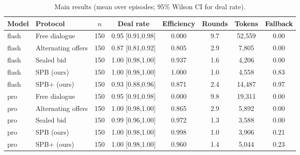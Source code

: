 \begin{table}[t]\centering
\caption{Main results (mean over episodes; 95\% Wilson CI for deal rate).}
\label{tab:v3main}
\begin{tabular}{llcccccc}\toprule
Model & Protocol & $n$ & Deal rate & Efficiency & Rounds & Tokens & Fallback \\ \midrule
flash & Free dialogue & 150 & 0.95 [0.91,0.98] & 0.000 & 9.7 & 52,559 & 0.00 \\
flash & Alternating offers & 150 & 0.87 [0.81,0.92] & 0.805 & 2.9 & 7,805 & 0.00 \\
flash & Sealed bid & 150 & 1.00 [0.98,1.00] & 0.937 & 1.6 & 4,206 & 0.00 \\
flash & SPB (ours) & 150 & 1.00 [0.98,1.00] & 1.000 & 1.0 & 4,558 & 0.83 \\
flash & SPB+ (ours) & 150 & 0.93 [0.88,0.96] & 0.871 & 2.4 & 14,487 & 0.97 \\
pro & Free dialogue & 150 & 0.95 [0.91,0.98] & 0.000 & 9.8 & 19,311 & 0.00 \\
pro & Alternating offers & 150 & 1.00 [0.98,1.00] & 0.865 & 2.9 & 5,892 & 0.00 \\
pro & Sealed bid & 150 & 0.99 [0.96,1.00] & 0.972 & 1.3 & 3,588 & 0.00 \\
pro & SPB (ours) & 150 & 1.00 [0.98,1.00] & 0.998 & 1.0 & 3,906 & 0.21 \\
pro & SPB+ (ours) & 150 & 1.00 [0.98,1.00] & 0.960 & 1.4 & 5,044 & 0.23 \\
\bottomrule\end{tabular}\end{table}